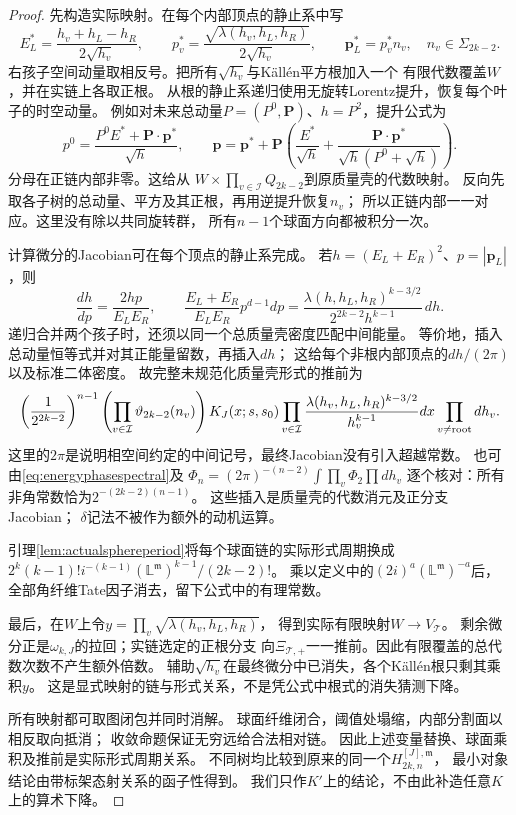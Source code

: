 \documentclass[11pt,a4paper]{ctexart}
\theoremstyle{cnplain}\newtheorem{theorem}{定理}[section]
\theoremstyle{definition}\newtheorem{definition}[theorem]{定义}
\theoremstyle{remark}\newtheorem{remark}[theorem]{注}
\begin{document}
\begin{proof}
先构造实际映射。在每个内部顶点的静止系中写
\[
 E_L^*=\frac{h_v+h_L-h_R}{2\sqrt{h_v}},\qquad
 p_v^*=\frac{\sqrt{\lambda(h_v,h_L,h_R)}}{2\sqrt{h_v}},
 \qquad \boldsymbol p_L^*=p_v^* n_v,\quad n_v\in\Sigma_{2k-2}.
\]
右孩子空间动量取相反号。把所有$\sqrt{h_v}$与Källén平方根加入一个
有限代数覆盖$W$，并在实链上各取正根。
从根的静止系递归使用无旋转Lorentz提升，恢复每个叶子的时空动量。
例如对未来总动量$P=(P^0,\boldsymbol P)$、$h=P^2$，提升公式为
\[
 p^0=\frac{P^0 E^*+\boldsymbol P\cdot\boldsymbol p^*}{\sqrt h},\qquad
 \boldsymbol p=\boldsymbol p^*+
 \boldsymbol P\left(\frac{E^*}{\sqrt h}
       +\frac{\boldsymbol P\cdot\boldsymbol p^*}{\sqrt h(P^0+\sqrt h)}\right).
\]
分母在正链内部非零。这给从
$W\times\prod_{v\in\mathcal I}Q_{2k-2}$到原质量壳的代数映射。
反向先取各子树的总动量、平方及其正根，再用逆提升恢复$n_v$；
所以正链内部一一对应。这里没有除以共同旋转群，
所有$n-1$个球面方向都被积分一次。

计算微分的Jacobian可在每个顶点的静止系完成。
若$h=(E_L+E_R)^2$、$p=|\boldsymbol p_L|$，则
\[
 \frac{dh}{dp}=\frac{2hp}{E_LE_R},\qquad
 \frac{E_L+E_R}{E_LE_R}p^{d-1}dp
 =\frac{\lambda(h,h_L,h_R)^{k-3/2}}
             {2^{2k-2}h^{k-1}}\,dh.
\]
递归合并两个孩子时，还须以同一个总质量壳密度匹配中间能量。
等价地，插入总动量恒等式并对其正能量留数，再插入$dh$；
这给每个非根内部顶点的$dh/(2\pi)$以及标准二体密度。
故完整未规范化质量壳形式的推前为
\begin{equation}\label{eq:angularrawconstant}
 \left(\frac1{2^{2k-2}}\right)^{n-1}
 \left(\prod_{v\in\mathcal I}\vartheta_{2k-2}(n_v)\right)
 K_J(x;s,s_0)
 \prod_{v\in\mathcal I}
 \frac{\lambda(h_v,h_L,h_R)^{k-3/2}}{h_v^{k-1}}
 dx\prod_{v\ne{\rm root}}dh_v .
\end{equation}
这里的$2\pi$是说明相空间约定的中间记号，最终Jacobian没有引入超越常数。
也可由\eqref{eq:energyphasespectral}及
$\Phi_n=(2\pi)^{-(n-2)}\int\prod_v\Phi_2\prod dh_v$
逐个核对：所有非角常数恰为$2^{-(2k-2)(n-1)}$。
这些插入是质量壳的代数消元及正分支Jacobian；
$\delta$记法不被作为额外的动机运算。

引理\ref{lem:actualsphereperiod}将每个球面链的实际形式周期换成
$2^{k}(k-1)!i^{-(k-1)}(\mathbb L^{\mathfrak m})^{k-1}/(2k-2)!$。
乘以定义中的$(2i)^a(\mathbb L^{\mathfrak m})^{-a}$后，
全部角纤维Tate因子消去，留下公式中的有理常数。

最后，在$W$上令$y=\prod_v\sqrt{\lambda(h_v,h_L,h_R)}$，
得到实际有限映射$W\to V_{\mathcal T}$。
剩余微分正是$\omega_{k,J}$的拉回；实链选定的正根分支
向$\Xi_{\mathcal T,+}$一一推前。因此有限覆盖的总代数次数不产生额外倍数。
辅助$\sqrt{h_v}$在最终微分中已消失，各个Källén根只剩其乘积$y$。
这是显式映射的链与形式关系，不是凭公式中根式的消失猜测下降。

所有映射都可取图闭包并同时消解。
球面纤维闭合，阈值处塌缩，内部分割面以相反取向抵消；
收敛命题保证无穷远给合法相对链。
因此上述变量替换、球面乘积及推前是实际形式周期关系。
不同树均比较到原来的同一个$H_{2k,n}^{[J],\mathfrak m}$，
最小对象结论由带标架态射关系的函子性得到\cite{brown}。
我们只作$K'$上的结论，不由此补造任意$K$上的算术下降。
\end{proof}
\end{document}
